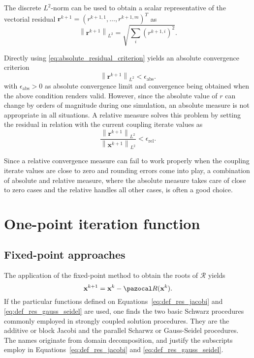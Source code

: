 The discrete  $L^{2}$-norm can be used to obtain a scalar representative of the vectorial residual \(\mathbf r^{k+1}=\left(r^{k+1,1}, \ldots, r^{k+1,m}\right)^{T}\) as
\begin{equation} \label{eq:absolute_residual_criterion}
\left\|\mathbf{r}^{k+1}\right\|_{L^{2}}=\sqrt{\sum_{i}\left(r^{k+1, i}\right)^{2}}.
\end{equation}

Directly using \eqref{eq:absolute_residual_criterion} yields an absolute convergence criterion
\begin{equation}
\left\|\boldsymbol{r} ^{k+1}\right\|_{L^{2}}<\epsilon_\mathrm{abs}.
\end{equation}
with $\epsilon_\mathrm{abs}>0$ as absolute convergence limit and convergence being obtained when the above condition renders valid.
However, since the absolute value of $r$ can change by orders of magnitude during one simulation, an absolute measure is not appropriate in all situations.
A relative measure solves this problem by setting the residual in relation with the current coupling iterate values as
\begin{equation}
\frac{\left\|\mathbf{r}^{k+1}\right\|_{L^{2}}}{\left\|\mathbf{x}^{k+1}\right\|_{L^{2}}}<\epsilon_\mathrm{rel}.
\end{equation}

Since a relative convergence measure can fail to work properly when the coupling iterate values are close to zero and rounding errors come into play, a combination of absolute and relative measure, where the absolute measure takes care of close to zero cases and the relative handles all other cases, is often a good choice.



\section{One-point iteration function}


\subsection{Fixed-point approaches}

The application of the fixed-point method to obtain the roots of \(\mathcal R\) yields
\begin{equation}
  \mathbf x^{k+1} = \mathbf x^k - \pazocal R(\mathbf x^k).
\end{equation}
If the particular functions defined on Equations~\eqref{eq:def_res_jacobi} and \eqref{eq:def_res_gauss_seidel} are used, one finds the  two basic Schwarz procedures commonly employed in strongly coupled solution procedures.
They are the additive or block Jacobi and the parallel Scharwz or Gauss-Seidel procedures.
The names originate from domain decomposition, and justify the subscripts employ in Equations~\eqref{eq:def_res_jacobi} and \eqref{eq:def_res_gauss_seidel}.

